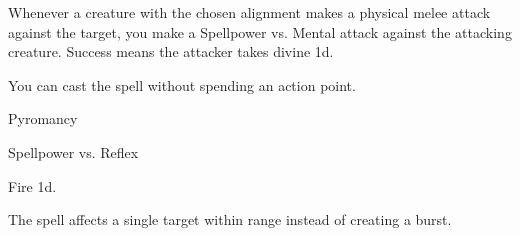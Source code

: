 
Whenever a creature with the chosen alignment makes a physical melee attack against the target, you make a Spellpower vs. Mental attack against the attacking creature.
Success means the attacker takes divine  \minus1d.






You can cast the spell without spending an action point.




\newpage
\begin{spellsection}{Pyromancy}

\begin{spellheader}
\end{spellheader}

\begin{spellcontent}

\begin{spelltargetinginfo}




\end{spelltargetinginfo}


\begin{spelleffects}




\begin{spellattack}{Spellpower vs. Reflex}


\spellsuccess Fire  \minus1d.


\end{spellattack}





\end{spelleffects}

\end{spellcontent}
\begin{spellfooter}


\end{spellfooter}
\begin{spellsubcontent}


\begin{spellcantrip}
The spell affects a single target within range instead of creating a burst.
\end{spellcantrip}


\end{spellsubcontent}
\end{spellsection}


